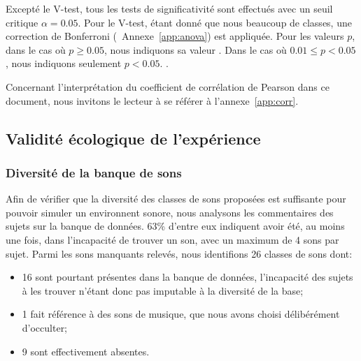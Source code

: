 Excepté le V-test, tous les tests de significativité sont effectués avec un seuil critique $\alpha=0.05$. Pour le V-test, étant donné que nous   beaucoup de classes, une correction de Bonferroni (\cf~Annexe~\ref{app:anova}) est appliquée. Pour les valeurs $p$, dans le cas où $p\geq0.05$, nous indiquons sa valeur . Dans le cas où $0.01\leq p<0.05$, nous indiquons seulement $p<0.05$.  .

Concernant l'interprétation du coefficient de corrélation de Pearson   dans ce document, nous invitons le lecteur à se référer à l'annexe~\ref{app:corr}.

\subsection{Validité écologique de l'expérience}

\subsubsection{Diversité de la banque de sons}

Afin de vérifier que la diversité des classes de sons proposées est suffisante pour pouvoir simuler un environnent sonore, nous analysons les commentaires des sujets sur la banque de données. 63\% d'entre eux indiquent avoir été, au moins une fois, dans l'incapacité de trouver un son, avec un maximum de 4 sons par sujet. Parmi les sons manquants relevés, nous identifions 26 classes de sons dont:

\begin{itemize}
\item 16 sont pourtant présentes dans la banque de données, l'incapacité des sujets à les trouver n'étant donc pas imputable à la diversité de la base;
\item 1 fait référence à des sons de musique, que nous avons choisi délibérément d'occulter;
\item 9 sont effectivement absentes.  
\end{itemize}

